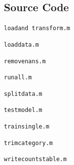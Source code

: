 \documentclass[journal]{IEEEtran}
\newcommand{\codelisting}[2]{
    \texttt{#1}
    
}
\begin{document}
\subsection*{Source Code}

\codelisting{load\textunderscore and \textunderscore transform.m}{src/load_and_transform.m}
\codelisting{load\textunderscore data.m}{src/load_data.m}
\codelisting{remove\textunderscore nans.m}{src/remove_nans.m}
\codelisting{run\textunderscore all.m}{src/run_all.m}
\codelisting{split\textunderscore data.m}{src/split_data.m}
\codelisting{test\textunderscore model.m}{src/test_model.m}
\codelisting{train\textunderscore single.m}{src/train_single.m}
\codelisting{trim\textunderscore category.m}{src/trim_category.m}
\codelisting{write\textunderscore counts\textunderscore table.m}{src/write_counts_table.m}




\end{document}
